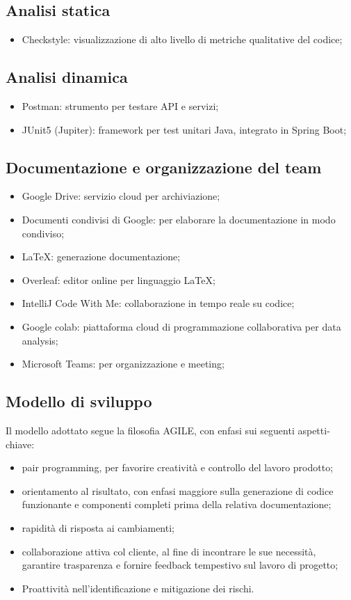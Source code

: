 \subsection{Analisi statica}
\begin{itemize}
	\item Checkstyle: visualizzazione di alto livello di metriche qualitative del codice;
\end{itemize}

\subsection{Analisi dinamica}
\begin{itemize}
	\item Postman: strumento per testare API e servizi;
	\item JUnit5 (Jupiter): framework per test unitari Java, integrato in Spring Boot;
\end{itemize}

\subsection{Documentazione e organizzazione del team}
\begin{itemize}
	\item Google Drive: servizio cloud per archiviazione;
	\item Documenti condivisi di Google: per elaborare la documentazione in modo condiviso;
	\item \LaTeX: generazione documentazione;
    \item Overleaf: editor online per linguaggio \LaTeX;
    \item IntelliJ Code With Me: collaborazione in tempo reale su codice;
    \item Google colab: piattaforma cloud di programmazione collaborativa per data analysis;
	\item Microsoft Teams: per organizzazione e meeting;
\end{itemize}

\subsection{Modello di sviluppo}
Il modello adottato segue la filosofia AGILE, con enfasi sui seguenti aspetti-chiave:
\begin{itemize}
	\item pair programming, per favorire creatività e controllo del lavoro prodotto;
	\item orientamento al risultato, con enfasi maggiore sulla generazione di codice funzionante e componenti completi prima della relativa documentazione;
	\item rapidità di risposta ai cambiamenti;
	\item collaborazione attiva col cliente, al fine di incontrare le sue necessità, garantire trasparenza e fornire feedback tempestivo sul lavoro di progetto;
	\item Proattività nell’identificazione e mitigazione dei rischi.
\end{itemize}

\clearpage
